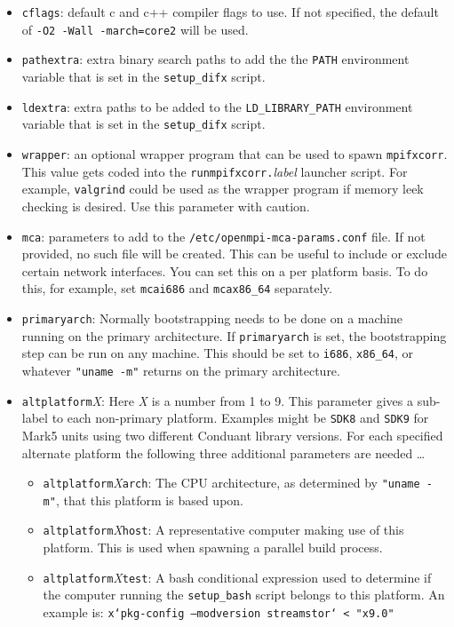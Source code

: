 \begin{itemize}
\item {\tt cflags}: default c and c++ compiler flags to use.
If not specified, the default of {\tt -O2 -Wall -march=core2} will be used.

\item {\tt pathextra}: extra binary search paths to add the the {\tt PATH} environment variable that is set in the {\tt setup\_difx} script.

\item {\tt ldextra}: extra paths to be added to the {\tt LD\_LIBRARY\_PATH} environment variable that is set in the {\tt setup\_difx} script.

\item {\tt wrapper}: an optional wrapper program that can be used to spawn {\tt mpifxcorr}.
This value gets coded into the {\tt runmpifxcorr.}{\em label} launcher script.
For example, {\tt valgrind} could be used as the wrapper program if memory leek checking is desired.
Use this parameter with caution.

\item {\tt mca}: parameters to add to the {\tt /etc/openmpi-mca-params.conf} file.
If not provided, no such file will be created.
This can be useful to include or exclude certain network interfaces.
You can set this on a per platform basis.
To do this, for example, set {\tt mcai686} and {\tt mcax86\_64} separately.

\item {\tt primaryarch}: Normally bootstrapping needs to be done on a machine running on the primary architecture.
If {\tt primaryarch} is set, the bootstrapping step can be run on any machine.
This should be set to {\tt i686}, {\tt x86\_64}, or whatever {\tt "uname -m"} returns on the primary architecture.

\item {\tt altplatform}{\em X}: Here {\em X} is a number from 1 to 9.
This parameter gives a sub-label to each non-primary platform.
Examples might be {\tt SDK8} and {\tt SDK9} for Mark5 units using two different Conduant library versions.
For each specified alternate platform the following three additional parameters are needed \ldots

\begin{itemize}
\item {\tt altplatform}{\em X}{\tt arch}: The CPU architecture, as determined by {\tt "uname -m"}, that this platform is based upon.

\item {\tt altplatform}{\em X}{\tt host}: A representative computer making use of this platform.
This is used when spawning a parallel build process.

\item {\tt altplatform}{\em X}{\tt test}: A bash conditional expression used to determine if the computer running the {\tt setup\_bash} script belongs to this platform.
An example is: {\tt x`pkg-config --modversion streamstor` < "x9.0"}

\end{itemize}
\end{itemize}







